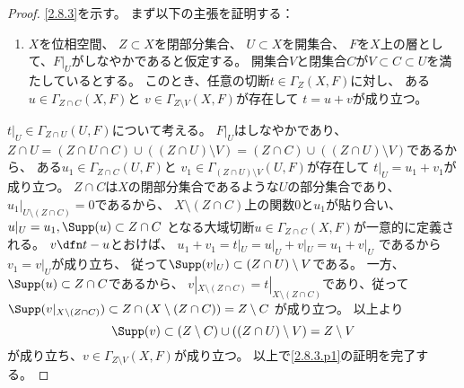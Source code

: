 \documentclass[uplatex,dvipdfmx]{jsarticle}
\begin{document}
\begin{proof}
  \ref{2.8.3}を示す。
  まず以下の主張を証明する：
  \begin{enumerate}[label=(\fnsymbol*),start=2]
    \item \label{2.8.3.p1}
    \(X\)を位相空間、
    \(Z\subset X\)を閉部分集合、
    \(U\subset X\)を開集合、
    \(F\)を\(X\)上の層として、\(F|_U\)がしなやかであると仮定する。
    開集合\(V\)と閉集合\(C\)が\(V\subset C\subset U\)を満たしているとする。
    このとき、任意の切断\(t\in \Gamma_Z(X,F)\)に対し、
    ある\(u\in \Gamma_{Z\cap C}(X,F)\)と
    \(v\in \Gamma_{Z\setminus V}(X,F)\)が存在して
    \(t=u+v\)が成り立つ。
  \end{enumerate}
  \(t|_U\in \Gamma_{Z\cap U}(U,F)\)について考える。
  \(F|_U\)はしなやかであり、
  \(Z\cap U = (Z\cap U\cap C) \cup ((Z\cap U)\setminus V)
  = (Z\cap C) \cup ((Z\cap U)\setminus V)\)であるから、
  ある\(u_1\in \Gamma_{Z\cap C}(U,F)\)と
  \(v_1\in \Gamma_{(Z\cap U)\setminus V}(U,F)\)が存在して
  \(t|_U = u_1+v_1\)が成り立つ。
  \(Z\cap C\)は\(X\)の閉部分集合であるような\(U\)の部分集合であり、
  \(u_1|_{U\setminus (Z\cap C)} = 0\)であるから、
  \(X\setminus (Z\cap C)\)上の関数\(0\)と\(u_1\)が貼り合い、
  \(u|_U = u_1, \Supp(u) \subset Z\cap C\)
  となる大域切断\(u\in \Gamma_{Z\cap C}(X,F)\)が一意的に定義される。
  \(v \dfn t-u\)とおけば、
  \(u_1+v_1 = t|_U = u|_U + v|_U = u_1 + v|_U\)
  であるから\(v_1 = v|_U\)が成り立ち、
  従って\(\Supp(v|_U)\subset (Z\cap U)\setminus V\)である。
  一方、\(\Supp(u)\subset Z\cap C\)であるから、
  \(v|_{X\setminus(Z\cap C)} = t|_{X\setminus (Z\cap C)}\)であり、従って
  \(\Supp(v|_{X\setminus(Z\cap C)}) \subset Z\cap (X\setminus (Z\cap C)) = Z\setminus C\)
  が成り立つ。
  以上より
  \[
  \Supp(v)\subset (Z\setminus C)\cup ((Z\cap U)\setminus V) = Z\setminus V
  \]
  が成り立ち、\(v\in \Gamma_{Z\setminus V}(X,F)\)が成り立つ。
  以上で\ref{2.8.3.p1}の証明を完了する。


\end{proof}
\end{document}
